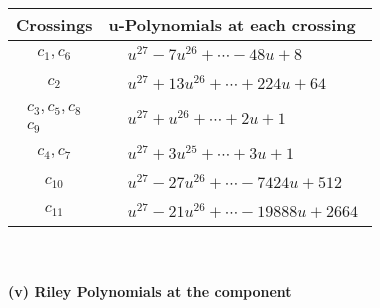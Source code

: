 \documentclass[1p]{elsarticle_modified}
\theoremstyle{definition}
\begin{document}
\begin{tabular}{m{50pt}|m{274pt}}
Crossings & \hspace{64pt}u-Polynomials at each crossing \\
\hline $$\begin{aligned}c_{1},c_{6}\end{aligned}$$&$\begin{aligned}
&u^{27}-7 u^{26}+\cdots-48 u+8
\end{aligned}$\\
\hline $$\begin{aligned}c_{2}\end{aligned}$$&$\begin{aligned}
&u^{27}+13 u^{26}+\cdots+224 u+64
\end{aligned}$\\
\hline $$\begin{aligned}c_{3},c_{5},c_{8}\\c_{9}\end{aligned}$$&$\begin{aligned}
&u^{27}+u^{26}+\cdots+2 u+1
\end{aligned}$\\
\hline $$\begin{aligned}c_{4},c_{7}\end{aligned}$$&$\begin{aligned}
&u^{27}+3 u^{25}+\cdots+3 u+1
\end{aligned}$\\
\hline $$\begin{aligned}c_{10}\end{aligned}$$&$\begin{aligned}
&u^{27}-27 u^{26}+\cdots-7424 u+512
\end{aligned}$\\
\hline $$\begin{aligned}c_{11}\end{aligned}$$&$\begin{aligned}
&u^{27}-21 u^{26}+\cdots-19888 u+2664
\end{aligned}$\\
\hline
\end{tabular}\\~\\
\newpage\renewcommand{\arraystretch}{1}
\flushleft \textbf{(v) Riley Polynomials at the component}\newline \\
\end{document}
